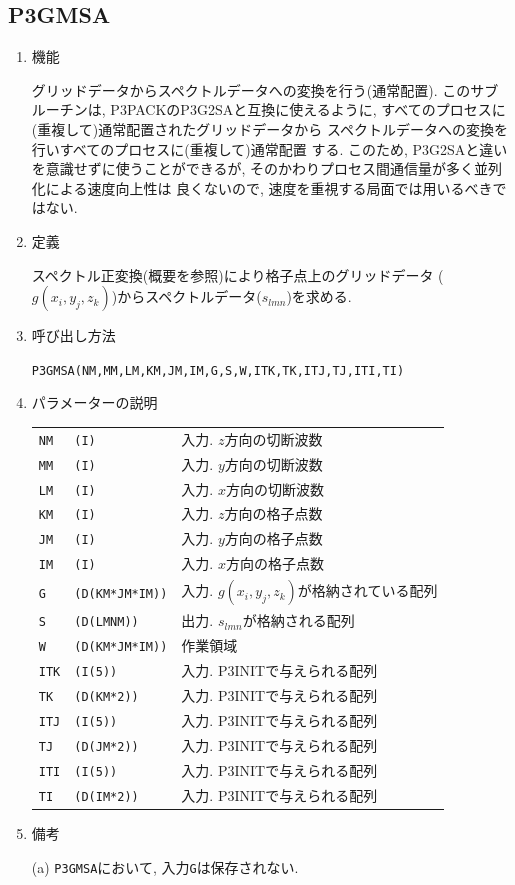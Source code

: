 \documentclass[a4j,fleqn]{jarticle}
\begin{document}

\subsection{P3GMSA}

\begin{enumerate}

\item 機能 

グリッドデータからスペクトルデータへの変換を行う(通常配置).
このサブルーチンは, P3PACKのP3G2SAと互換に使えるように,
すべてのプロセスに(重複して)通常配置されたグリッドデータから
スペクトルデータへの変換を行いすべてのプロセスに(重複して)通常配置
する. このため, P3G2SAと違いを意識せずに使うことができるが,
そのかわりプロセス間通信量が多く並列化による速度向上性は
良くないので, 速度を重視する局面では用いるべきではない.

\item 定義

スペクトル正変換(概要を参照)により格子点上のグリッドデータ
($g(x_i,y_j,z_k)$)からスペクトルデータ($s_{lmn}$)を求める.

\item 呼び出し方法 

{\tt P3GMSA(NM,MM,LM,KM,JM,IM,G,S,W,ITK,TK,ITJ,TJ,ITI,TI)}
  
\item パラメーターの説明

\begin{tabular}{lll}
{\tt NM} & {\tt (I)} & 入力. $z$方向の切断波数\\
{\tt MM} & {\tt (I)} & 入力. $y$方向の切断波数\\
{\tt LM} & {\tt (I)} & 入力. $x$方向の切断波数\\
{\tt KM} & {\tt (I)} & 入力. $z$方向の格子点数\\
{\tt JM} & {\tt (I)} & 入力. $y$方向の格子点数\\
{\tt IM} & {\tt (I)} & 入力. $x$方向の格子点数\\
{\tt G} & {\tt (D(KM*JM*IM))} & 入力. $g(x_i,y_j,z_k)$が格納されている配列\\
{\tt S} & {\tt (D(LMNM))} & 
                 出力. $s_{lmn}$が格納される配列\\
{\tt W} & {\tt (D(KM*JM*IM))} & 作業領域\\
{\tt ITK} & {\tt (I(5))} & 入力. P3INITで与えられる配列\\
{\tt TK} & {\tt (D(KM*2))} & 入力. P3INITで与えられる配列\\
{\tt ITJ} & {\tt (I(5))} & 入力. P3INITで与えられる配列\\
{\tt TJ} & {\tt (D(JM*2))} & 入力. P3INITで与えられる配列\\
{\tt ITI} & {\tt (I(5))} & 入力. P3INITで与えられる配列\\
{\tt TI} & {\tt (D(IM*2))} & 入力. P3INITで与えられる配列
\end{tabular}

\item 備考

(a) {\tt P3GMSA}において, 入力{\tt G}は保存されない.

\end{enumerate}
\end{document}
